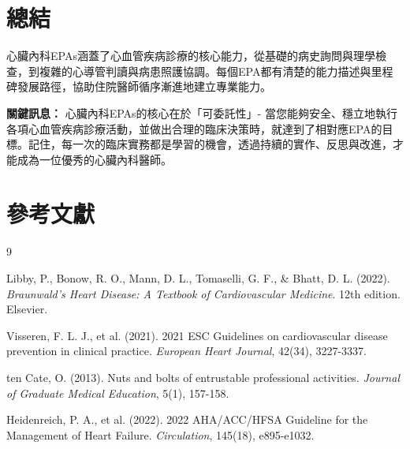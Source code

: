 \documentclass[12pt,a4paper]{article}
\begin{document}
\section{總結}

心臟內科EPAs涵蓋了心血管疾病診療的核心能力，從基礎的病史詢問與理學檢查，到複雜的心導管判讀與病患照護協調。每個EPA都有清楚的能力描述與里程碑發展路徑，協助住院醫師循序漸進地建立專業能力。

\begin{importantbox}
\textbf{關鍵訊息：} 心臟內科EPAs的核心在於「可委託性」- 當您能夠安全、穩立地執行各項心血管疾病診療活動，並做出合理的臨床決策時，就達到了相對應EPA的目標。記住，每一次的臨床實務都是學習的機會，透過持續的實作、反思與改進，才能成為一位優秀的心臟內科醫師。
\end{importantbox}

\section{參考文獻}
\begin{thebibliography}{9}

Libby, P., Bonow, R. O., Mann, D. L., Tomaselli, G. F., \& Bhatt, D. L. (2022). \textit{Braunwald's Heart Disease: A Textbook of Cardiovascular Medicine}. 12th edition. Elsevier.

Visseren, F. L. J., et al. (2021). 2021 ESC Guidelines on cardiovascular disease prevention in clinical practice. \textit{European Heart Journal}, 42(34), 3227-3337.

ten Cate, O. (2013). Nuts and bolts of entrustable professional activities. \textit{Journal of Graduate Medical Education}, 5(1), 157-158.

Heidenreich, P. A., et al. (2022). 2022 AHA/ACC/HFSA Guideline for the Management of Heart Failure. \textit{Circulation}, 145(18), e895-e1032.

\end{thebibliography}
\end{document}
